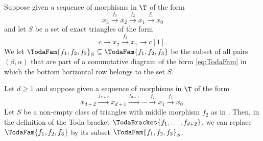 \documentclass[a4paper]{amsart}
\begin{document}
\begin{notation}
  \label{not:TodaFamS}
  Suppose given a sequence of morphisms in $\T$ of the form
  \[
    x_3\xrightarrow{f_3}x_2\xrightarrow{f_2}x_1\xrightarrow{f_1}x_0
  \]
  and let $S$ be a set of exact triangles of the form
  \[
    c\to x_2\xrightarrow{f_2}x_1\to c[1].
  \]
  We let $\TodaFam{f_1,f_2,f_3}_S\subseteq\TodaFam{f_1,f_2,f_3}$ be the subset
  of all pairs $(\beta,\alpha)$ that are part of a commutative diagram of the
  form \eqref{eq:TodaFam} in which the bottom horizontal row belongs to the set
  $S$.
\end{notation}

\begin{lemma}
  \label{lemma:TodaBracket_S}
  Let $d\geq1$ and suppose given a sequence of morphisms in $\T$ of the form
  \[
    x_{d+2}\xrightarrow{f_{d+2}}x_{d+1}\xrightarrow{f_{d+1}}\cdots\xrightarrow{f_2}x_1\xrightarrow{f_1}x_0.
  \]
  Let $S$ be a non-empty class of triangles with middle morphism $f_2$ as in
  . Then, in the definition of the Toda bracket
  $\TodaBracket{f_1,\dots,f_{d+2}}$, we can replace $\TodaFam{f_1,f_2,f_3}$ by
  its subset $\TodaFam{f_1,f_2,f_3}_S$.
\end{lemma}
\end{document}
